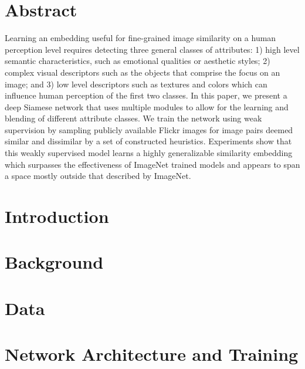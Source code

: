 \documentclass[11pt, notitlepage]{report}
\begin{document}
\hypersetup{pageanchor=false}
\tableofcontents

\hypersetup{pageanchor=true}
\thispagestyle{empty}
\cleardoublepage

\chapter*{Abstract} \label{section:abstract}
	Learning an embedding useful for fine-grained image similarity on a human perception level requires detecting three general classes of attributes: 1) high level semantic characteristics, such as emotional qualities or aesthetic styles; 2) complex visual descriptors such as the objects that comprise the focus on an image; and 3) low level descriptors such as textures and colors which can influence human perception of the first two classes. In this paper, we present a deep Siamese network that uses multiple modules to allow for the learning and blending of different attribute classes. We train the network using weak supervision by sampling publicly available Flickr images for image pairs deemed similar and dissimilar by a set of constructed heuristics. Experiments show that this weakly supervised model learns a highly generalizable similarity embedding which surpasses the effectiveness of ImageNet trained models and appears to span a space mostly outside that described by ImageNet.
	

\chapter{Introduction} \label{chapter:intro}


\chapter{Background} \label{chapter:background}


\chapter{Data} \label{chapter:data}


\chapter{Network Architecture and Training} \label{chapter:network}

\end{document}
